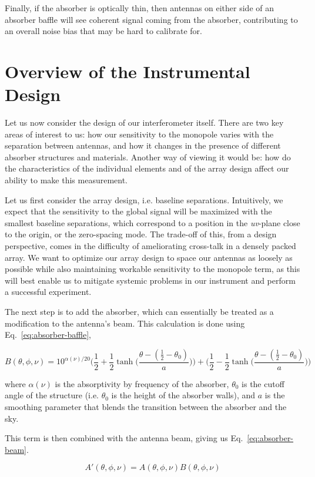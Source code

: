 Finally, if the absorber is optically thin, then antennas on either side of an 
absorber baffle will see coherent signal coming from the absorber, contributing 
to an overall noise bias that may be hard to calibrate for.

\section{Overview of the Instrumental Design}

Let us now consider the design of our interferometer itself. There are two key 
areas of interest to us: how our sensitivity to the monopole varies with the 
separation between antennas, and how it changes in the presence of different 
absorber structures and materials. Another way of viewing it would be: how do 
the characteristics of the individual elements and of the array design affect 
our ability to make this measurement.

Let us first consider the array design, i.e. baseline separations. Intuitively, 
we expect that the sensitivity to the global signal will be maximized with the 
smallest baseline separations, which correspond to a position in the 
\emph{uv}-plane close to the origin, or the zero-spacing mode.  The trade-off 
of this, from a design perspective, comes in the difficulty of ameliorating 
cross-talk in a densely packed array. We want to optimize our array design to 
space our antennas as loosely as possible while also maintaining workable 
sensitivity to the monopole term, as this will best enable us to mitigate 
systemic problems in our instrument and perform a successful experiment.

The next step is to add the absorber, which can essentially be treated as a 
modification to the antenna's beam. This calculation is done using 
Eq.~\eqref{eq:absorber-baffle},

\begin{equation}
    \label{eq:absorber-baffle}
    B(\theta, \phi, \nu) = 10^{\alpha(\nu)/20} \Big(\frac{1}{2} + \frac{1}{2} 
    \tanh\Big(\frac{\theta - (\frac{1}{2} - \theta_{0})}{a}\Big)\Big) +
    \Big(\frac{1}{2} - \frac{1}{2} \tanh\Big(\frac{\theta - (\frac{1}{2} - 
    \theta_{0})}{a}\Big)\Big)
\end{equation}

where $\alpha(\nu)$ is the absorptivity by frequency of the absorber, 
$\theta_0$ is the cutoff angle of the structure (i.e. $\theta_0$ is the height 
of the absorber walls), and $a$ is the smoothing parameter that blends the 
transition between the absorber and the sky.

This term is then combined with the antenna beam, giving us 
Eq.~\eqref{eq:absorber-beam}.

\begin{equation}
    \label{eq:absorber-beam}
    A'(\theta, \phi, \nu) = A(\theta, \phi, \nu) B(\theta, \phi, \nu)
\end{equation}
